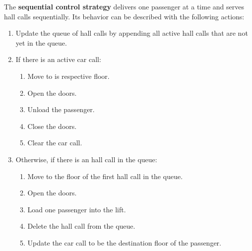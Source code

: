 The \textbf{sequential control strategy} delivers one passenger at a time and serves hall calls sequentially. 
Its behavior can be described with the following actions:
\begin{enumerate}[noitemsep]
    \item Update the queue of hall calls by appending all active hall calls that are not yet in the queue.
    \item If there is an active car call:
    \begin{enumerate}[noitemsep]
        \item Move to is respective floor.
        \item Open the doors.
        \item Unload the passenger. 
        \item Close the doors. 
        \item Clear the car call.
    \end{enumerate}
    \item Otherwise, if there is an hall call in the queue:
    \begin{enumerate}[noitemsep]
        \item Move to the floor of the first hall call in the queue. 
        \item Open the doors.
        \item Load one passenger into the lift. 
        \item Delete the hall call from the queue.
        \item Update the car call to be the destination floor of the passenger.
    \end{enumerate}
\end{enumerate}

